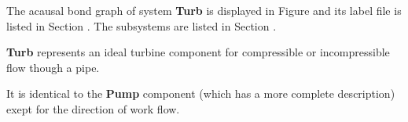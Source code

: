 

   The acausal bond graph of system \textbf{Turb} is
   displayed in Figure  and its label
   file is listed in Section .
   The subsystems are listed in Section .

\textbf{Turb} represents an ideal turbine component for compressible
or incompressible flow though a pipe.

It is identical to the \textbf{Pump} component (which has a more
complete description) exept for the direction of work flow.
